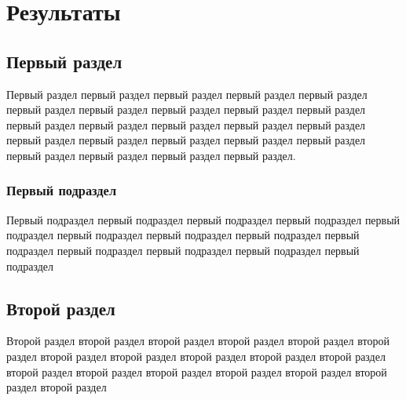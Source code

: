 \section{Результаты}

\subsection{Первый раздел}
    Первый раздел первый раздел первый раздел первый раздел первый раздел первый раздел первый раздел первый раздел первый раздел первый раздел первый раздел первый раздел первый раздел первый раздел первый раздел первый раздел первый раздел первый раздел первый раздел первый раздел первый раздел первый раздел первый раздел первый раздел. 
    
    \subsubsection{Первый подраздел}
        Первый подраздел первый подраздел первый подраздел первый подраздел первый подраздел первый подраздел первый подраздел первый подраздел первый подраздел первый подраздел первый подраздел первый подраздел первый подраздел 

\subsection{Второй раздел}
    Второй раздел второй раздел второй раздел второй раздел второй раздел второй раздел второй раздел второй раздел второй раздел второй раздел второй раздел второй раздел второй раздел второй раздел второй раздел второй раздел второй раздел второй раздел 
    
        
\clearpage